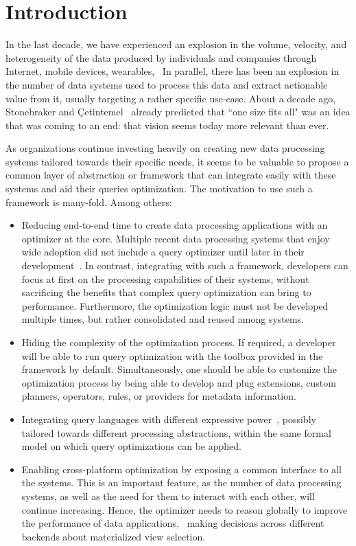 \section{Introduction}
\label{sec:intro}

In the last decade, we have experienced an explosion in the volume, velocity, and heterogeneity of the data produced by individuals and companies through Internet, mobile devices, wearables, \etc\ In parallel, there has been an explosion in the number of data systems used to process this data and extract actionable value from it, usually targeting a rather specific use-case. About a decade ago, Stonebraker and \c{C}etintemel~\cite{DBLP:conf/icde/StonebrakerC05} already predicted that ``one size fits all" was an idea that was coming to an end: that vision seems today more relevant than ever.

As organizations continue investing heavily on creating new data processing systems tailored towards their specific needs, it seems to be valuable to propose a common layer of abstraction or framework that can integrate easily with these systems and aid their queries optimization. The motivation to use such a framework is many-fold. Among others:

\begin{itemize}
	\item Reducing end-to-end time to create data processing applications with an optimizer at the core. Multiple recent data processing systems that enjoy wide adoption did not include a query optimizer until later in their development~\cite{DBLP:conf/sigmod/ArmbrustXLHLBMK15,DBLP:conf/sigmod/HuaiCGHHOPYL014}. In contrast, integrating with such a framework, developers can focus at first on the processing capabilities of their systems, without sacrificing the benefits that complex query optimization can bring to performance. Furthermore, the optimization logic must not be developed multiple times, but rather consolidated and reused among systems.
	\item Hiding the complexity of the optimization process. If required, a developer will be able to run query optimization with the toolbox provided in the framework by default. Simultaneously, one should be able to customize the optimization process by being able to develop and plug extensions, \eg custom planners, operators, rules, or providers for metadata information.
	\item Integrating query languages with different expressive power~\cite{DBLP:journals/cacm/Hyde10,DBLP:conf/sigmod/MeijerBB06}, possibly tailored towards different processing abstractions, within the same formal model on which query optimizations can be applied.%
	\item Enabling cross-platform optimization by exposing a common interface to all the systems. This is an important feature, as the number of data processing systems, as well as the need for them to interact with each other, will continue increasing. Hence, the optimizer needs to reason globally to improve the performance of data applications, \eg\ making decisions across different backends about materialized view selection.
\end{itemize}

